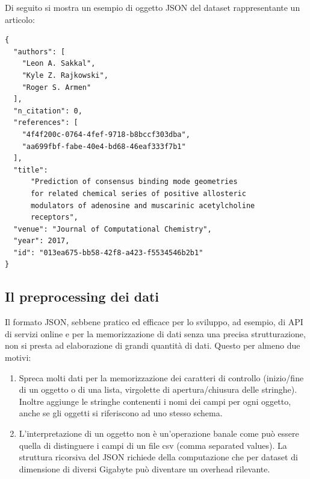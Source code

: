 \documentclass[a4paper, 12pt]{article}
\begin{document}
Di seguito si mostra un esempio di oggetto JSON del dataset rappresentante un articolo:
\begin{lstlisting}[keepspaces=true]
{
  "authors": [
    "Leon A. Sakkal",
    "Kyle Z. Rajkowski",
    "Roger S. Armen"
  ],
  "n_citation": 0,
  "references": [
    "4f4f200c-0764-4fef-9718-b8bccf303dba",
    "aa699fbf-fabe-40e4-bd68-46eaf333f7b1"
  ],
  "title":
      "Prediction of consensus binding mode geometries
      for related chemical series of positive allosteric
      modulators of adenosine and muscarinic acetylcholine
      receptors",
  "venue": "Journal of Computational Chemistry",
  "year": 2017,
  "id": "013ea675-bb58-42f8-a423-f5534546b2b1"
}
\end{lstlisting}
\subsection{Il preprocessing dei dati}
Il formato JSON, sebbene pratico ed efficace per lo sviluppo, ad esempio, di API di servizi online e per la memorizzazione di dati senza una precisa strutturazione, non si presta ad elaborazione di grandi quantità di dati. Questo per almeno due motivi:
\begin{enumerate}
  \item Spreca molti dati per la memorizzazione dei caratteri di controllo (inizio/fine di un oggetto o di una lista, virgolette di apertura/chiusura delle stringhe). Inoltre aggiunge le stringhe contenenti i nomi dei campi per ogni oggetto, anche se gli oggetti si riferiscono ad uno stesso schema.
  \item L'interpretazione di un oggetto non è un'operazione banale come può essere quella di distinguere i campi di un file csv (comma separated values). La struttura ricorsiva del JSON richiede della computazione che per dataset di dimensione di diversi Gigabyte può diventare un overhead rilevante.
\end{enumerate}
\end{document}
